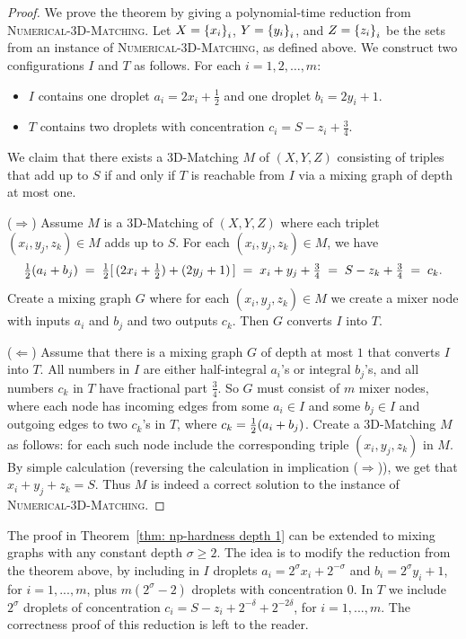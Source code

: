 \begin{proof}
We prove the theorem by giving a polynomial-time reduction from \textsc{Numerical-3D-Matching}.
Let
$X = { \left\{ x_i \right\} }_i$, $Y = { \left\{ y_i \right\} }_i$, and $Z = { \left\{ z_i \right\} }_i$ be the sets from an
instance of \textsc{Numerical-3D-Matching}, as defined above.
We construct two configurations $I$ and $T$ as follows.
For each $i = 1, 2, \dots, m$:
	\begin{itemize}
		\item $I$ contains one droplet $a_i = 2 x_i + \frac{1}{2}$ and one droplet $b_i = 2  y_i + 1$.
		\item $T$ contains two droplets with concentration $c_i = S - z_i + \frac{3}{4}$.
	\end{itemize}
	
We claim that there exists a 3D-Matching $M$ of $(X,Y,Z)$ consisting of triples that
add up to $S$ if and only if $T$ is reachable from $I$ via a mixing graph of depth at most one.


\smallskip
\noindent
 ($\Longrightarrow$)	
	Assume $M$ is a 3D-Matching of $(X, Y, Z)$ where each triplet $(x_i, y_j, z_k)\in M$ adds up to $S$.
	For each $(x_i,y_j,z_k)\in M$, we have 
	\begin{equation*}
		\textstyle
			{\textstyle\frac{1}{2}} (a_i + b_j) \; = \; {\textstyle\frac{1}{2}} [\, (2x_i+\frac{1}{2}) + (2y_j + 1)\, ]
			\; = \; x_i + y_j + \frac{3}{4}
			\; = \; S - z_k + \frac{3}{4}
			\; = \; c_k.
	\end{equation*}
	Create a mixing graph $G$ where
	for each $(x_i, y_j, z_k)\in M$ we create a mixer node with inputs $a_i$ and $b_j$
	and two outputs $c_k$. Then $G$ converts $I$ into $T$.

\smallskip
\noindent
($\Longleftarrow$)	
	Assume that there is a mixing graph $G$ of depth at most $1$ that converts $I$ into $T$.
	All numbers in $I$ are either half-integral $a_i$'s or integral $b_j$'s,
	and all numbers $c_k$ in $T$ have fractional part $\frac{3}{4}$. So $G$ must consist of
	$m$ mixer nodes, where each node has incoming edges from some $a_i \in I$ and some $b_j\in I$ and outgoing
	edges to two $c_k$'s in $T$, where $c_k = {\textstyle\frac{1}{2}} (a_i + b_j)$.	
	Create a 3D-Matching $M$ as follows: for each such node include 
	the corresponding triple $(x_i, y_j, z_k)$ in $M$.
	By simple calculation (reversing the calculation in implication ($\Longrightarrow$)), 
	we get that $x_i + y_j + z_k = S$.
Thus $M$ is indeed a correct solution to the instance of \textsc{Numerical-3D-Matching}.
\end{proof}


The proof in Theorem~\ref{thm: np-hardness depth 1} 
can be extended to mixing graphs with any constant depth $\sigma\ge 2$.
The idea is to modify the reduction from the theorem above, by
including in $I$ droplets $a_i = 2^\sigma x_i + 2^{-\sigma}$ and $b_i = 2^\sigma y_i + 1$,
for $i=1,...,m$, plus $m(2^\sigma-2)$ droplets with concentration $0$.
In $T$ we include $2^\sigma$ droplets of concentration 
$c_i = S - z_i + 2^{-\delta} + 2^{-2\delta}$, for $i=1,...,m$. 
The correctness proof of this reduction is left to the reader.
